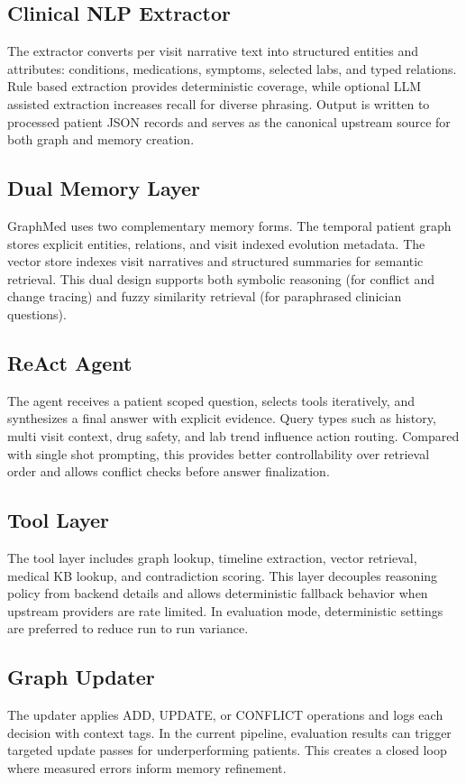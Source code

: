 \documentclass[conference]{IEEEtran}
\begin{document}
\subsection{Clinical NLP Extractor}
The extractor converts per visit narrative text into structured entities and attributes: conditions, medications, symptoms, selected labs, and typed relations. Rule based extraction provides deterministic coverage, while optional LLM assisted extraction increases recall for diverse phrasing. Output is written to processed patient JSON records and serves as the canonical upstream source for both graph and memory creation.

\subsection{Dual Memory Layer}
GraphMed uses two complementary memory forms. The temporal patient graph stores explicit entities, relations, and visit indexed evolution metadata. The vector store indexes visit narratives and structured summaries for semantic retrieval. This dual design supports both symbolic reasoning (for conflict and change tracing) and fuzzy similarity retrieval (for paraphrased clinician questions).

\subsection{ReAct Agent}
The agent receives a patient scoped question, selects tools iteratively, and synthesizes a final answer with explicit evidence. Query types such as history, multi visit context, drug safety, and lab trend influence action routing. Compared with single shot prompting, this provides better controllability over retrieval order and allows conflict checks before answer finalization.

\subsection{Tool Layer}
The tool layer includes graph lookup, timeline extraction, vector retrieval, medical KB lookup, and contradiction scoring. This layer decouples reasoning policy from backend details and allows deterministic fallback behavior when upstream providers are rate limited. In evaluation mode, deterministic settings are preferred to reduce run to run variance.

\subsection{Graph Updater}
The updater applies ADD, UPDATE, or CONFLICT operations and logs each decision with context tags. In the current pipeline, evaluation results can trigger targeted update passes for underperforming patients. This creates a closed loop where measured errors inform memory refinement.
\end{document}
